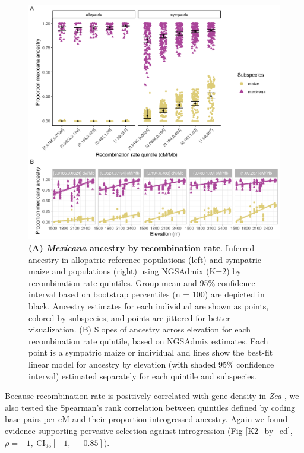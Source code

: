 \begin{figure}[ht]
\includegraphics[width=.95\textwidth]{chapter2/figures/K2_by_r_multi_panel.png}
\caption{\color{Gray} \textbf{(A) \textit{Mexicana} ancestry by recombination rate}. Inferred \mexicana ancestry in  allopatric reference populations (left) and sympatric maize and \mexicana populations (right) using NGSAdmix (K=2) by recombination rate quintiles. Group mean and 95\% confidence interval based on bootstrap percentiles (n = 100) are depicted in black. Ancestry estimates for each individual are shown as points, colored by subspecies, and points are jittered for better visualization. (B) Slopes of \mexicana ancestry across elevation for each recombination rate quintile, based on NGSAdmix estimates. Each point is a sympatric maize or \mexicana individual and lines show the best-fit linear model for ancestry by elevation (with shaded 95\% confidence interval) estimated separately for each quintile and subspecies.}
\label{K2_by_r}
\end{figure} 

Because recombination rate is positively correlated with gene density in \textit{Zea} \cite{Schnable:2009_B73}, we also tested the Spearman's rank correlation between quintiles defined by coding base pairs per cM and their proportion introgressed \mexicana ancestry. 
Again we found evidence supporting pervasive selection against introgression (Fig \ref{K2_by_cd}, $\rho = -1,\ \text{CI}_{95}[-1,\ -0.85]$).

